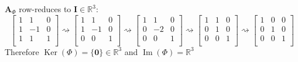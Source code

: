 \documentclass[11pt]{article}
\newcommand{\R}{\mathbb{R}}
\newcommand{\vect}[1]{\bm{#1}}      %
\newcommand{\mat}[1]{\mathbf{#1}}   %
\DeclareMathOperator{\Ker}{Ker}
\DeclareMathOperator{\Img}{Im}
\theoremstyle{definition}
\theoremstyle{plain}
\theoremstyle{remark}
\begin{document}
\begin{enumerate}
\begin{enumerate}
                    $\mat{A}_\Phi$ row-reduces to $\mat{I} \in \R^3$:
                    \[
                        \begin{bmatrix}
                            1 & 1  & 0 \\
                            1 & -1 & 0 \\
                            1 & 1  & 1 \\
                        \end{bmatrix}
                        \rightsquigarrow
                        \begin{bmatrix}
                            1 & 1  & 0 \\
                            1 & -1 & 0 \\
                            0 & 0  & 1 \\
                        \end{bmatrix}
                        \rightsquigarrow
                        \begin{bmatrix}
                            1 & 1  & 0 \\
                            0 & -2 & 0 \\
                            0 & 0  & 1 \\
                        \end{bmatrix}
                        \rightsquigarrow
                        \begin{bmatrix}
                            1 & 1 & 0 \\
                            0 & 1 & 0 \\
                            0 & 0 & 1 \\
                        \end{bmatrix}
                        \rightsquigarrow
                        \begin{bmatrix}
                            1 & 0 & 0 \\
                            0 & 1 & 0 \\
                            0 & 0 & 1 \\
                        \end{bmatrix}
                    \]
                    Therefore $\Ker(\Phi) = \{ \vect{0} \} \in \R^3$ and $\Img(\Phi) = \R^3$


\end{enumerate}
\end{enumerate}
\end{document}
